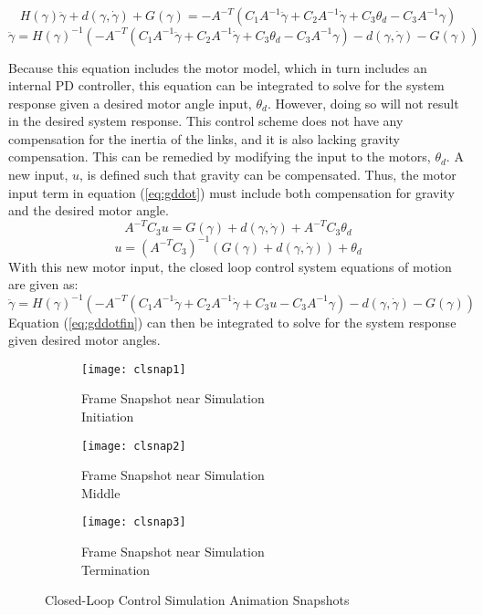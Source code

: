 \[
H(\gamma) \ddot{\gamma}+d(\gamma, \dot{\gamma})+G(\gamma)=-A^{-T}\left(C_1A^{-1} \ddot{\gamma}+C_2 A^{-1} \dot{\gamma}+C_3 \theta_{d}- C_3A^{-1} \gamma\right)
\]
\begin{equation}
\ddot{\gamma}=H(\gamma)^{-1}\left(-A^{-T}\left(C_1 A^{-1} \ddot{\gamma}+C_2 A^{-1} \dot{\gamma}+C_3 \theta_{d}-C_3A^{-1} \gamma\right)-d(\gamma, \dot{\gamma})-G(\gamma)\right)
\label{eq:gddot}
\end{equation}

Because this equation includes the motor model, which in turn includes an internal PD controller, this equation can be integrated to solve for the system response given a desired motor angle input, $\theta_d$. However, doing so will not result in the desired system response. This control scheme does not have any compensation for the inertia of the links, and it is also lacking gravity compensation. This can be remedied by modifying the input to the motors, $\theta_d$. A new input, $u$, is defined such that gravity can be compensated. Thus, the motor input term in equation (\ref{eq:gddot}) must include both compensation for gravity and the desired motor angle.
\[
A^{-T} C_3  u=G(\gamma)+d(\gamma, \dot{\gamma})+A^{-T} C_3\theta_{d}
\]
\begin{equation}
u=\left(A^{-T} C_3\right)^{-1} \left(G(\gamma)+d(\gamma, \dot{\gamma})\right) + \theta_{d}
\end{equation}
With this new motor input, the closed loop control system equations of motion are given as:
\begin{equation}
\ddot{\gamma}=H(\gamma)^{-1}\left(-A^{-T}\left(C_1 A^{-1} \ddot{\gamma}+C_2 A^{-1} \dot{\gamma}+C_3 u-C_3A^{-1} \gamma\right)-d(\gamma, \dot{\gamma})-G(\gamma)\right)
\label{eq:gddotfin}
\end{equation}
Equation (\ref{eq:gddotfin}) can then be integrated to solve for the system response given desired motor angles.

\begin{figure}[htp]
  \center
  \begin{subfigure}[c]{0.33\textwidth}
    \center
    \texttt{[image: clsnap1]}
    \caption{Frame Snapshot near Simulation \\Initiation}
  \end{subfigure}%
  \begin{subfigure}[c]{0.33\textwidth}
    \center
    \texttt{[image: clsnap2]}
    \caption{Frame Snapshot near Simulation \\Middle}
  \end{subfigure}%
\begin{subfigure}[c]{0.33\textwidth}
  \center
  \texttt{[image: clsnap3]}
  \caption{Frame Snapshot near Simulation \\Termination}
\end{subfigure}
  \caption{Closed-Loop Control Simulation Animation Snapshots}
  \label{fig:clsnaps}
\end{figure}

